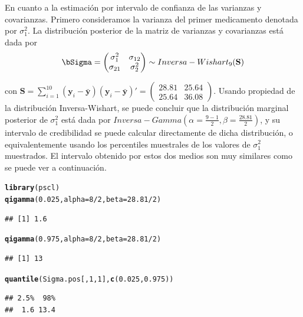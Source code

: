 \documentclass[10pt,openright]{book}\usepackage[]{graphicx}\usepackage[]{color}
\makeatletter
\newcommand{\hlnum}[1]{\textcolor[rgb]{0.686,0.059,0.569}{#1}}%
\newcommand{\hlopt}[1]{\textcolor[rgb]{0,0,0}{#1}}%
\newcommand{\hlstd}[1]{\textcolor[rgb]{0.345,0.345,0.345}{#1}}%
\newcommand{\hlkwc}[1]{\textcolor[rgb]{0.333,0.667,0.333}{#1}}%
\newcommand{\hlkwd}[1]{\textcolor[rgb]{0.737,0.353,0.396}{\textbf{#1}}}%
\newenvironment{kframe}{%
 \def\at@end@of@kframe{}%
 \ifinner\ifhmode%
  \def\at@end@of@kframe{\end{minipage}}%
  \begin{minipage}{\columnwidth}%
 \fi\fi%
 \def\FrameCommand##1{\hskip\@totalleftmargin \hskip-\fboxsep
 \colorbox{shadecolor}{##1}\hskip-\fboxsep
     \hskip-\linewidth \hskip-\@totalleftmargin \hskip\columnwidth}%
 \MakeFramed {\advance\hsize-\width
   \@totalleftmargin\z@ \linewidth\hsize
   \@setminipage}}%
 {\par\unskip\endMakeFramed%
 \at@end@of@kframe}
\newenvironment{knitrout}{}{} %
\makeatother
\begin{document}
\begin{Eje}
En cuanto a la estimaci\'on por intervalo de confianza de las varianzas y covarianzas. Primero consideramos la varianza del primer medicamento denotada por $\sigma^2_1$. La distribuci\'on posterior de la matriz de varianzas y covarianzas est\'a dada por
\begin{equation*}
\bSigma=\begin{pmatrix}\sigma^2_1&\sigma_{12}\\\sigma_{21}&\sigma^2_{2} \end{pmatrix}\sim Inversa-Wishart_9(\mathbf{S})
\end{equation*}

con $\mathbf{S}=\sum_{i=1}^{10}(\mathbf{y}_i-\bar{\mathbf{y}})(\mathbf{y}_i-\bar{\mathbf{y}})'=\begin{pmatrix}28.81&25.64\\25.64&36.08\end{pmatrix}$. Usando propiedad de la distribuci\'on Inversa-Wishart, se puede concluir que la distribuci\'on marginal posterior de $\sigma^2_1$ est\'a dada por $Inversa-Gamma(\alpha=\frac{9-1}{2}, \beta=\frac{28.81}{2})$, y su intervalo de credibilidad se puede calcular directamente de dicha distribuci\'on, o equivalentemente usando los percentiles muestrales de los valores de $\sigma^2_1$ muestrados. El intervalo obtenido por estos dos medios son muy similares como se puede ver a continuaci\'on.
\begin{knitrout}
\color{fgcolor}\begin{kframe}
\begin{alltt}
\hlkwd{library}\hlstd{(pscl)}
\hlkwd{qigamma}\hlstd{(}\hlnum{0.025}\hlstd{,} \hlkwc{alpha}\hlstd{=}\hlnum{8}\hlopt{/}\hlnum{2}\hlstd{,} \hlkwc{beta}\hlstd{=}\hlnum{28.81}\hlopt{/}\hlnum{2}\hlstd{)}
\end{alltt}
\begin{verbatim}
## [1] 1.6
\end{verbatim}
\begin{alltt}
\hlkwd{qigamma}\hlstd{(}\hlnum{0.975}\hlstd{,} \hlkwc{alpha}\hlstd{=}\hlnum{8}\hlopt{/}\hlnum{2}\hlstd{,} \hlkwc{beta}\hlstd{=}\hlnum{28.81}\hlopt{/}\hlnum{2}\hlstd{)}
\end{alltt}
\begin{verbatim}
## [1] 13
\end{verbatim}
\begin{alltt}
\hlkwd{quantile}\hlstd{(Sigma.pos[,}\hlnum{1}\hlstd{,}\hlnum{1}\hlstd{],} \hlkwd{c}\hlstd{(}\hlnum{0.025}\hlstd{,} \hlnum{0.975}\hlstd{))}
\end{alltt}
\begin{verbatim}
## 2.5%  98% 
##  1.6 13.4
\end{verbatim}
\end{kframe}
\end{knitrout}


\end{Eje}
\end{document}
